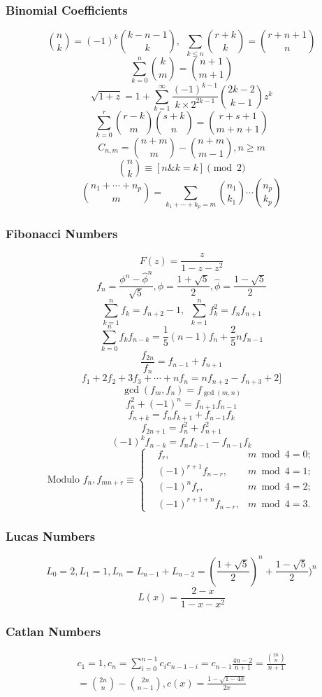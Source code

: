 \subsubsection{Binomial Coefficients}
\[ {n \choose k} = (-1)^k{k-n-1 \choose k},\ \ \sum_{k \leq n}{r+k \choose k} = {r+n+1 \choose n} \]
\[ \sum_{k=0}^n{k \choose m} = {n+1 \choose m+1} \]
\[ \sqrt{1+z} = 1 + \sum_{k=1}^{\infty}\frac{(-1)^{k-1}}{k\times2^{2k-1}}{2k-2 \choose k-1}z^k \]
\[ \sum_{k=0}^{r}{r-k \choose m}{s+k \choose n} = {r+s+1 \choose m+n+1} \]
\[ C_{n, m} = {n+m \choose m} - {n+m \choose m-1}, n \geq m \]
\[ {n \choose k} \equiv [n\& k=k] \pmod 2 \]
\[ {{n_1+\cdots+n_p}\choose m}=\sum_{k_1+\cdots+k_p=m}{n_1\choose k_1}\cdots{n_p\choose k_p}\]
\subsubsection{Fibonacci Numbers}
\[ F(z) = \frac{z}{1-z-z^2} \]
\[ f_n = \frac{{\phi}^n-{\hat{\phi}}^n}{\sqrt{5}}, \phi = \frac{1+\sqrt{5}}{2},
\hat{\phi} = \frac{1-\sqrt{5}}{2} \]
\[ \sum_{k=1}^nf_k = f_{n+2}-1,\ \ \sum_{k=1}^nf^2_k = f_nf_{n+1} \]
\[ \sum_{k=0}^nf_kf_{n-k} = \frac{1}{5}(n-1)f_n+\frac{2}{5}nf_{n-1} \]
\[ \frac{f_{2n}}{f_n} = f_{n-1} + f_{n+1}\]
\[ f_1+2f_2+3f_3+\cdots+nf_n=nf_{n+2}-f_{n+3}+2]\]
\[ \gcd(f_m,f_n)=f_{\gcd(m,n)}\]
\[ f^2_n + (-1)^n = f_{n+1}f_{n-1} \]
\[ f_{n+k} = f_nf_{k+1} + f_{n-1}f_k \]
\[ f_{2n+1} = f^2_n+f^2_{n+1} \]
\[ (-1)^kf_{n-k} = f_{n}f_{k-1} - f_{n-1}f_{k} \]
\[ \text{Modulo }f_n, f_{mn+r} \equiv \left\{
\begin{aligned}
&f_r,& m \bmod 4 = 0; \\
&(-1)^{r+1}f_{n-r},& m \bmod 4 = 1; \\
&(-1)^nf_r,& m \bmod 4 = 2; \\
&(-1)^{r+1+n}f_{n-r},& m \bmod 4 = 3.
\end{aligned}
\right.
\]
\subsubsection{Lucas Numbers}
\[ L_0=2,L_1=1,L_n=L_{n-1}+L_{n-2}=(\frac{1+\sqrt{5}}{2})^n+\frac{1-\sqrt{5}}{2})^n \]
\[ L(x)=\frac{2-x}{1-x-x^2} \]
\subsubsection{Catlan Numbers}
\begin{align*}
c_1=1,c_n=\sum_{i=0}^{n-1}c_ic_{n-1-i}=c_{n-1}\frac{4n-2}{n+1}=\frac{\binom{2n}{n}}{n+1}\\
=\binom{2n}{n}-\binom{2n}{n-1}, c(x)=\frac{1-\sqrt{1-4x}}{2x}
\end{align*}
